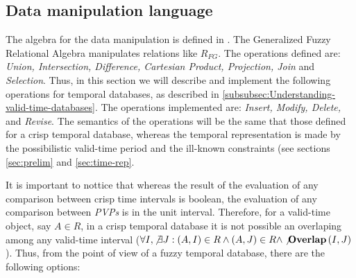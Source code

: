 \subsection{\label{subsec:data-manipulation}Data manipulation language}

The algebra for the data manipulation is defined in \cite{Medina1994}. The Generalized Fuzzy Relational Algebra manipulates relations like $R_{FG}$. The operations defined are: \emph{Union, Intersection, Difference, Cartesian Product, Projection, Join} and \emph{Selection}. Thus, in this section we will describe and implement the following operations for temporal databases, as described in \ref{subsubsec:Understanding-valid-time-databases}. The operations implemented are: \emph{Insert, Modify, Delete, } and \emph{Revise}. The semantics of the operations will be the same that those defined for a crisp temporal database, whereas the temporal representation is made by the possibilistic valid-time period and the ill-known constraints (see sections \ref{sec:prelim} and \ref{sec:time-rep}.

It is important to nottice that whereas the result of the evaluation of any comparison between crisp time intervals is boolean, the evaluation of any comparison between \emph{PVPs} is in the unit interval.  Therefore, for a valid-time object, say $A \in R$, in a crisp temporal database it is not possible an overlaping among any valid-time interval ($\forall I, \not \exists J: \left(A, I \right) \in R \wedge \left(A, J \right) \in R \wedge \not \mbox{\textbf{Overlap}}\left(I, J \right)$). Thus, from the point of view of a fuzzy temporal database, there are the following options:

